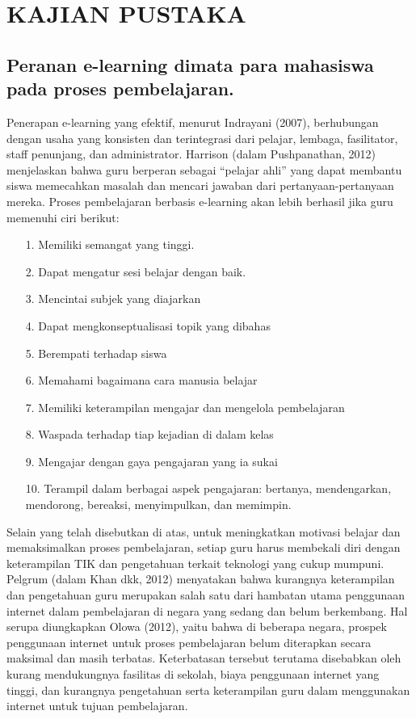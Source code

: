 \documentclass{jtetiproposalskripsi}
\begin{document}
\chapter{KAJIAN PUSTAKA}               
\section{Peranan e-learning dimata para mahasiswa pada proses pembelajaran.}
Penerapan e-learning yang efektif, menurut Indrayani (2007), berhubungan dengan usaha yang konsisten dan terintegrasi dari pelajar, lembaga, fasilitator, staff penunjang, dan administrator. Harrison (dalam Pushpanathan, 2012) menjelaskan bahwa guru berperan sebagai “pelajar ahli” yang dapat membantu siswa memecahkan masalah dan mencari jawaban dari pertanyaan-pertanyaan mereka. Proses pembelajaran berbasis e-learning akan lebih berhasil jika guru memenuhi ciri berikut:
\begin{itemize}
\item[1.]Memiliki semangat yang tinggi.
\item[2.]Dapat mengatur sesi belajar dengan baik.
\item[3.]Mencintai subjek yang diajarkan
\item[4.]Dapat mengkonseptualisasi topik yang dibahas
\item[5.]Berempati terhadap siswa
\item[6.]Memahami bagaimana cara manusia belajar
\item[7.]Memiliki keterampilan mengajar dan mengelola pembelajaran
\item[8.]Waspada terhadap tiap kejadian di dalam kelas
\item[9.]Mengajar dengan gaya pengajaran yang ia sukai
\item[10.]Terampil dalam berbagai aspek pengajaran: bertanya, mendengarkan, mendorong, bereaksi, menyimpulkan, dan memimpin.
\end{itemize}

Selain yang telah disebutkan di atas, untuk meningkatkan motivasi belajar dan memaksimalkan proses pembelajaran, setiap guru harus membekali diri dengan keterampilan TIK dan pengetahuan terkait teknologi yang cukup mumpuni. Pelgrum (dalam Khan dkk, 2012) menyatakan bahwa kurangnya keterampilan dan pengetahuan guru merupakan salah satu dari hambatan utama penggunaan internet dalam pembelajaran di negara yang sedang dan belum berkembang. Hal serupa diungkapkan Olowa (2012), yaitu bahwa di beberapa negara, prospek penggunaan internet untuk proses pembelajaran belum diterapkan secara maksimal dan masih terbatas. Keterbatasan tersebut terutama disebabkan oleh kurang mendukungnya fasilitas di sekolah, biaya penggunaan internet yang tinggi, dan kurangnya pengetahuan serta keterampilan guru dalam menggunakan internet untuk tujuan pembelajaran.
\end{document}
